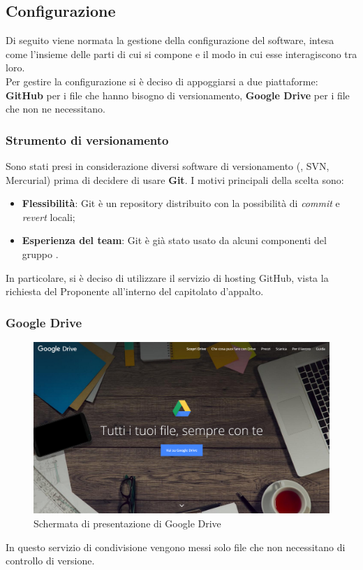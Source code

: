 \documentclass[../NormeDiProgetto.tex]{subfiles}
\begin{document}
		\subsection{Configurazione}\label{Configurazione}
			Di seguito viene normata la gestione della configurazione del software, intesa come l'insieme delle parti di cui si compone e il modo in cui esse interagiscono tra loro. \\
			
			Per gestire la configurazione si è deciso di appoggiarsi a due piattaforme:
			\textbf{GitHub} per i file che hanno bisogno di versionamento, \textbf{Google Drive} per i file che non ne necessitano.
			
			\subsubsection{Strumento di versionamento}
				Sono stati presi in considerazione diversi software di versionamento (, SVN, Mercurial)
				prima di decidere di usare \textbf{Git}. I motivi principali della scelta sono: 
				\begin{itemize}
					\item \textbf{Flessibilità}: Git è un repository distribuito con la possibilità di
					\textit{commit} e \textit{revert} locali;
					\item \textbf{Esperienza del team}: Git è già stato usato da alcuni componenti
					del gruppo \kaleidoscode.
				\end{itemize}
				In particolare, si è deciso di utilizzare il servizio di hosting GitHub, vista la richiesta
				del Proponente all'interno del capitolato d'appalto.
			\subsubsection{Google Drive}
				\begin{figure} [h!]
					\centering
					\includegraphics[scale=0.2]{./Immagini/Drive.png}
					\caption{Schermata di presentazione di Google Drive}\label{}
				\end{figure}
				In questo servizio di condivisione vengono messi solo file che non necessitano di
				controllo di versione.
				
\end{document}
